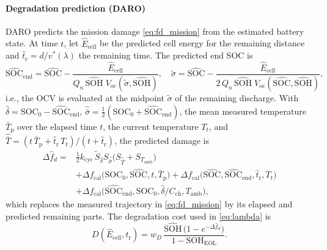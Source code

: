 \paragraph{Degradation prediction (DARO)}
DARO predicts the mission damage \eqref{eq:fd_mission} from the estimated battery state. At time $t$,
let $\hat E_{\mathrm{cell}}$ be the predicted cell energy for the remaining distance and
$\hat t_{\mathrm{r}} = d / v^\ast(\lambda)$ the remaining time. The predicted end \ac{SOC} is
\begin{equation}
  \widehat{\mathrm{SOC}}_{\mathrm{end}} = \widehat{\mathrm{SOC}}
    - \frac{\hat E_{\mathrm{cell}}}{Q_n\,\widehat{\mathrm{SOH}}\; V_{\mathrm{oc}}(\tilde\sigma, \widehat{\mathrm{SOH}})},
  \quad
  \tilde\sigma = \widehat{\mathrm{SOC}}
    - \frac{\hat E_{\mathrm{cell}}}{2\,Q_n\,\widehat{\mathrm{SOH}}\; V_{\mathrm{oc}}(\widehat{\mathrm{SOC}}, \widehat{\mathrm{SOH}})},
  \label{eq:soc_end_pred}
\end{equation}
i.e., the \ac{OCV} is evaluated at the midpoint $\tilde\sigma$ of the remaining discharge. With
$\hat\delta = \mathrm{SOC}_0 - \widehat{\mathrm{SOC}}_{\mathrm{end}}$,
$\hat{\bar\sigma} = \tfrac{1}{2}(\mathrm{SOC}_0 + \widehat{\mathrm{SOC}}_{\mathrm{end}})$, the mean measured
temperature $\bar T_{\mathrm{p}}$ over the elapsed time $t$, the current temperature $T_t$, and
$\hat{\bar T} = (t\,\bar T_{\mathrm{p}} + \hat t_{\mathrm{r}}\, T_t)/(t + \hat t_{\mathrm{r}})$, the
predicted damage is
\begin{equation}
\begin{aligned}
  \Delta\hat f_d = {} & \tfrac{1}{2} k_{\mathrm{cyc}}\, \widetilde{S}_{\hat\delta} S_{\hat{\bar\sigma}}
      \big(S_{\hat{\bar T}} + S_{T_{\mathrm{amb}}}\big) \\
  & + \Delta f_{\mathrm{cal}}\big(\mathrm{SOC}_0, \widehat{\mathrm{SOC}}, t, \bar T_{\mathrm{p}}\big)
    + \Delta f_{\mathrm{cal}}\big(\widehat{\mathrm{SOC}}, \widehat{\mathrm{SOC}}_{\mathrm{end}}, \hat t_{\mathrm{r}}, T_t\big) \\
  & + \Delta f_{\mathrm{cal}}\big(\widehat{\mathrm{SOC}}_{\mathrm{end}}, \mathrm{SOC}_0, \hat\delta / C_{\mathrm{ch}}, T_{\mathrm{amb}}\big),
\end{aligned}
  \label{eq:fd_pred}
\end{equation}
which replaces the measured trajectory in \eqref{eq:fd_mission} by its elapsed and predicted remaining
parts. The degradation cost used in \eqref{eq:lambda} is
\begin{equation}
  D(\hat E_{\mathrm{cell}}, \hat t_{\mathrm{r}})
  = w_D\, \frac{\widehat{\mathrm{SOH}}\,\big(1 - e^{-\Delta\hat f_d}\big)}{1 - \mathrm{SOH}_{\mathrm{EOL}}}.
  \label{eq:deg_cost}
\end{equation}
